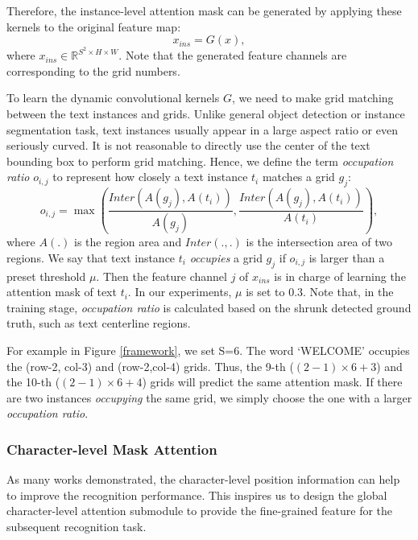 \documentclass[letterpaper]{article} \usepackage{aaai21}  \usepackage{times}  \usepackage{helvet} \usepackage{courier}  \usepackage[hyphens]{url}  \usepackage{graphicx} \urlstyle{rm} \def\UrlFont{\rm}  \usepackage{natbib}  \usepackage{caption} \frenchspacing  \setlength{\pdfpagewidth}{8.5in}  \setlength{\pdfpageheight}{11in}  \usepackage{multirow}
\begin{document}
Therefore, the instance-level attention mask can be generated by applying these kernels to the original feature map:
\begin{equation}
x_{ins} = G(x),
\label{eq-1}
\end{equation}
where $x_{ins} \in \mathbb{R}^{S^2 \times H \times W}$.
Note that the generated feature channels are corresponding to the grid numbers.

To learn the dynamic convolutional kernels $G$, we need to make grid matching between the text instances and grids.
Unlike general object detection or instance segmentation task, text instances usually appear in a large aspect ratio or even seriously curved.
It is not reasonable to directly use the center of the text bounding box to perform grid matching.
Hence, we define the term \emph{occupation ratio} $o_{i,j}$ to represent how closely a text instance $t_i$ matches a grid $g_j$:
\begin{equation}
o_{i,j}=\max\left(\frac{Inter(A(g_j),A(t_i))}{A(g_j)}, \frac{Inter(A(g_j),A(t_i))}{A(t_i)} \right),
\end{equation}
where $A(.)$ is the region area and $Inter(.,.)$ is the intersection area of two regions.
We say that text instance $t_i$ \emph{occupies} a grid $g_j$ if $o_{i,j}$ is larger than a preset threshold $\mu$.
Then the feature channel $j$ of $x_{ins}$ is in charge of learning the attention mask of text $t_{i}$.
In our experiments, $\mu$ is set to $0.3$.
Note that, in the training stage, \emph{occupation ratio} is calculated based on the shrunk detected ground truth, such as text centerline regions.

For example in Figure \ref{framework}, we set S=6. The word `WELCOME' occupies the (row-2, col-3) and (row-2,col-4) grids. Thus, the 9-th ($(2-1)\times 6+3$) and the 10-th ($(2-1)\times 6 + 4$) grids will predict the same attention mask.
If there are two instances \emph{occupying} the same grid, we simply choose the one with a larger \emph{occupation ratio}.

\subsubsection{Character-level Mask Attention}
As many works \cite{cheng2017focus,xing2019convolutional} demonstrated, the character-level position information can help to improve the recognition performance.
This inspires us to design the global character-level attention submodule to provide the fine-grained feature for the subsequent recognition task.
\end{document}
